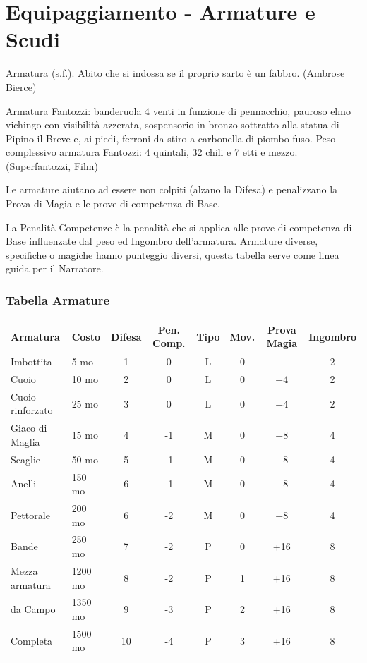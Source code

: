 \section{Equipaggiamento - Armature e Scudi} \hypertarget{equipaggiamento.armature.scudi}{}\label{equipaggiamentoarmature}

\label{equipaggiamento---armature-e-scudi}

\begin{enfasi}{
Armatura (s.f.). Abito che si indossa se il proprio sarto è un fabbro. (Ambrose Bierce)

\medskip

Armatura Fantozzi: banderuola 4 venti in funzione di pennacchio, pauroso elmo vichingo con visibilità azzerata, sospensorio in bronzo sottratto alla statua di Pipino il Breve e, ai piedi, ferroni da stiro a carbonella di piombo fuso. Peso complessivo armatura Fantozzi: 4 quintali, 32 chili e 7 etti e mezzo. (Superfantozzi, Film)} \end{enfasi}

Le armature aiutano ad essere non colpiti (alzano la Difesa) e penalizzano la Prova di Magia e le prove di competenza di Base.

La Penalità Competenze è la penalità che si applica alle prove di competenza di Base influenzate dal peso ed Ingombro dell'armatura. Armature diverse, specifiche o magiche hanno punteggio diversi, questa tabella serve come linea guida per il Narratore.

\subsubsection{Tabella Armature}

\label{tabella-armature}
\noindent\begin{tabularx}{\linewidth}{llcccccc}
	\toprule
\textbf{Armatura} & \textbf{Costo} & \textbf{Difesa} & \textbf{Pen. Comp.} & \textbf{Tipo} & \textbf{Mov.} & \textbf{Prova Magia}&\textbf{Ingombro}\\
\toprule
Imbottita & 5 mo & 1 & 0 & L 	& 		0 		& -		&2\\
Cuoio & 10 mo & 2 & 0 & L 		& 		0 		& +4		&2\\
Cuoio rinforzato& 25 mo& 3 & 0& L 	& 0 		& +4		&2\\
Giaco di Maglia & 15 mo & 4 & -1 & M & 0 		&+8			&4\\
Scaglie& 50 mo & 5& -1& M & 0 					&+8			&4\\
Anelli & 150 mo & 6& -1& M & 0 					&+8			&4\\
Pettorale& 200 mo & 6& -2& M & 0 				&+8			&4\\
Bande & 250 mo & 7& -2& P & 0 					&+16		&8\\
Mezza armatura& 1200 mo& 8& -2& P & 1 			&+16		&8\\
da Campo& 1350 mo& 9& -3& P & 2 				&+16		&8\\
Completa& 1500 mo& 10 & -4& P & 3 				&+16		&8
\end{tabularx}


